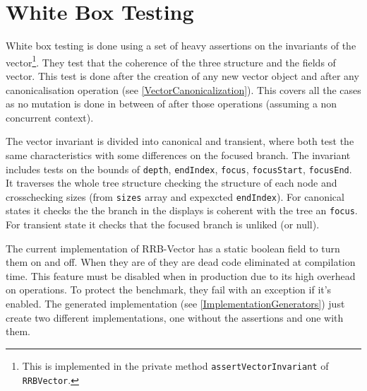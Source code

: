 \section{White Box Testing}
\label{InvariantAssertions}
White box testing is done using a set of heavy assertions on the invariants of the vector\footnote{This is implemented in the private method \texttt{assertVectorInvariant} of \texttt{RRBVector}.}. They test that the coherence of the three structure and the fields of vector. This test is done after the creation of any new vector object and after any canonicalisation operation (see \ref{VectorCanonicalization}). This covers all the cases as no mutation is done in between of after those operations (assuming a non concurrent context). 

The vector invariant is divided into canonical and transient, where both test the same characteristics with some differences on the focused branch. The invariant includes tests on the bounds of \texttt{depth}, \texttt{endIndex}, \texttt{focus}, \texttt{focusStart}, \texttt{focusEnd}. It traverses the whole tree structure checking the structure of each node and crosschecking sizes (from \texttt{sizes} array and expexcted \texttt{endIndex}). For canonical states it checks the the branch in the displays is coherent with the tree an \texttt{focus}. For transient state it checks that the focused branch is unliked (or null).

The current implementation of RRB-Vector has a static boolean field to turn them on and off. When they are of they are dead code eliminated at compilation time. This feature must be disabled when in production due to its high overhead on operations. To protect the benchmark, they fail with an exception if it's enabled. The generated implementation (see \ref{ImplementationGenerators}) just create two different implementations, one without the assertions and one with them.


